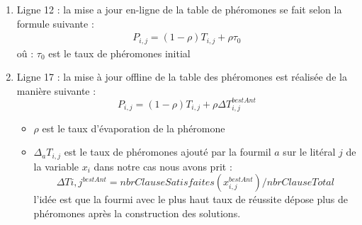 \begin{enumerate}
			
		
		
		
		\item Ligne 12 : la mise a jour en-ligne de la table de phéromones se fait selon la formule suivante : 
		\begin{eqnarray}
		P_{i,j} = (1-\rho)T_{i,j} + \rho \tau_0
		\end{eqnarray}
		oû : 
		$\tau_0$ est le taux de phéromones initial
		\item Ligne 17 : la mise à jour offline de la table des phéromones est réalisée de la manière suivante : 
		\begin{equation*}
			P_{i,j} = (1-\rho)T_{i,j} + \rho \Delta T_{i,j}^{bestAnt}
		\end{equation*}
		\begin{itemize}
			\item $\rho$ est le taux d'évaporation de la phéromone
			\item $\Delta_a T_{i,j}$ est le taux de phéromones ajouté par la fourmil $a$ sur le litéral $j$ de la variable $x_i$
			dans notre cas nous avons prit : \\
			\begin{equation}
			\Delta T{i,j}^{bestAnt} = nbrClauseSatisfaites(x_{i,j}^{bestAnt})/nbrClauseTotal
			\end{equation}
			l'idée est que la fourmi avec le plus haut taux de réussite dépose plus de phéromones après la construction des solutions.
		\end{itemize}
	\end{enumerate}
	\newpage
